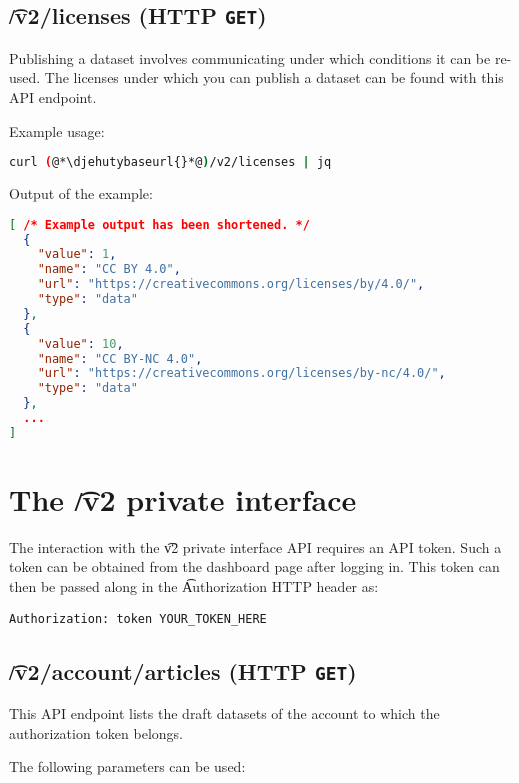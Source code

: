 \subsection{\t{/v2/licenses} (HTTP \texttt{GET})}
\label{sec:v2-licenses}

  Publishing a dataset involves communicating under which conditions it can be
  re-used.  The licenses under which you can publish a dataset can be found with
  this API endpoint.

  Example usage:
\begin{lstlisting}[language=bash]
curl (@*\djehutybaseurl{}*@)/v2/licenses | jq
\end{lstlisting}

  Output of the example:
\begin{lstlisting}[language=JSON]
[ /* Example output has been shortened. */
  {
    "value": 1,
    "name": "CC BY 4.0",
    "url": "https://creativecommons.org/licenses/by/4.0/",
    "type": "data"
  },
  {
    "value": 10,
    "name": "CC BY-NC 4.0",
    "url": "https://creativecommons.org/licenses/by-nc/4.0/",
    "type": "data"
  },
  ...
]
\end{lstlisting}

\section{The \t{/v2} private interface}

  The interaction with the \t{v2} private interface API requires an API token.
  Such a token can be obtained from the dashboard page after logging in.  This
  token can then be passed along in the \t{Authorization} HTTP header as:
\begin{lstlisting}
Authorization: token YOUR_TOKEN_HERE
\end{lstlisting}

\subsection{\t{/v2/account/articles} (HTTP \texttt{GET})}

  This API endpoint lists the draft datasets of the account to which the
  authorization token belongs.

  The following parameters can be used:

